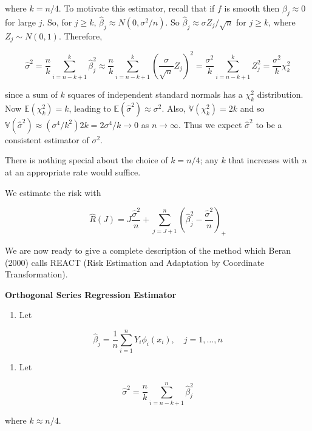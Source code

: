 where \(k = n / 4\). To motivate this estimator, recall that if \(f\) is
smooth then \(\beta_{j} \approx 0\) for large \(j\). So, for \(j \geq k\),
\(\hat{\beta}_{j} \approx N(0, \sigma^{2} / n)\). So
\(\hat{\beta}_{j} \approx \sigma Z_{j} / \sqrt{n}\) for \(j \geq k\), where
\(Z_{j} \sim N(0, 1)\). Therefore,

\[ \hat{\sigma}^{2} = \frac{n}{k} \sum_{i=n-k+1}^{k} \hat{\beta}_{j}^{2} \approx \frac{n}{k} \sum_{i=n-k+1}^{k} \left( \frac{\sigma}{\sqrt{n}} Z_{j} \right)^{2} = \frac{\sigma^{2}}{k} \sum_{i=n-k+1}^{k} Z_{j}^{2} = \frac{\sigma^{2}}{k} \chi_{k}^{2}\]

since a sum of \(k\) squares of independent standard normals has a
\(\chi_{k}^{2}\) distribution. Now \(\mathbb{E}(\chi_{k}^{2}) = k\), leading to
\(\mathbb{E}(\hat{\sigma}^{2}) \approx \sigma^{2}\). Also,
\(\mathbb{V}(\chi_{k}^{2}) = 2k\) and so
\(\mathbb{V}(\hat{\sigma}^{2}) \approx (\sigma^{4} / k^{2}) 2k = 2\sigma^{4} / k \rightarrow 0\)
as \(n \rightarrow \infty\). Thus we expect \(\hat{\sigma}^{2}\) to be a
consistent estimator of \(\sigma^{2}\).

There is nothing special about the choice of \(k = n / 4\); any \(k\)
that increases with \(n\) at an appropriate rate would suffice.

We estimate the risk with

\[ \hat{R}(J) = J \frac{\hat{\sigma}^{2}}{n} + \sum_{j=J+1}^{n} \left(\hat{\beta}_{j}^{2} - \frac{\hat{\sigma}^{2}}{n} \right)_{+} \]

We are now ready to give a complete description of the method which
Beran (2000) calls REACT (Risk Estimation and Adaptation by Coordinate
Transformation).

\textbf{Orthogonal Series Regression Estimator}

\begin{enumerate}[tightlist,label={\arabic*.}]
\item
  Let
\end{enumerate}

\[ \hat{\beta}_{j} = \frac{1}{n} \sum_{i=1}^{n} Y_{i} \phi_{i}(x_{i}), \quad j = 1, \dots, n\]

\begin{enumerate}[tightlist,label={\arabic*.}]
\item
  Let
\end{enumerate}

\[ \hat{\sigma}^{2} = \frac{n}{k} \sum_{i=n-k+1}^{n} \hat{\beta}_{j}^{2} \]

where \(k \approx n / 4\).

